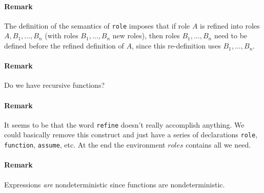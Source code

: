 \documentclass{report}
\begin{document}
\paragraph{Remark} The definition of the semantics of \texttt{role} imposes that if role $A$ is 
refined into roles $A, B_1,\ldots,B_n$ (with roles $B_1,\ldots,B_n$ new roles),
then roles $B_1,\ldots,B_n$ need
to be defined before the refined definition of $A$, since this re-definition uses $B_1,\ldots,B_n$.

\paragraph{Remark} Do we have recursive functions?

\paragraph{Remark} It seems to be that the word \texttt{refine} doesn't really accomplish
anything. We could basically remove this construct and just have a series of declarations
\texttt{role}, \texttt{function}, \texttt{assume}, etc. At the end the environment $roles$
contains all we need.

\paragraph{Remark} Expressions \emph{are} nondeterministic since functions are
nondeterministic.
\end{document}
